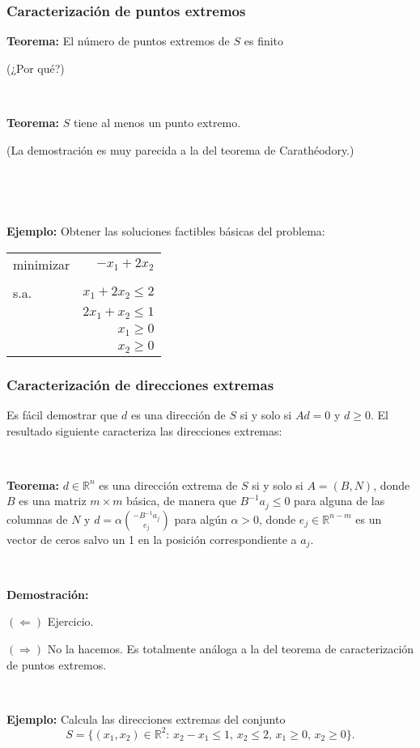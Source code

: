 \documentclass{beamer}
\begin{document}
\begin{frame}
\frametitle{Caracterización de puntos extremos}


{\bf Teorema:} El número de puntos extremos de $S$ es finito 

(¿Por qué?)

\

{\bf Teorema:} $S$ tiene al menos un punto extremo. 

(La demostración es muy parecida a la del teorema de Carathéodory.)


\



\

{\bf Ejemplo:} Obtener las soluciones factibles básicas del problema:

\begin{center}
\begin{tabular}{lr}
minimizar & $-x_1 + 2x_2$ \\
	 &  \\
s.a. & $x_1+2x_2 \leq 2$    \\
	 & $2x_1 + x_2\leq 1$  \\
	 & $x_1\geq 0$\\
	 & $x_2\geq 0$
\end{tabular}
\end{center}

\end{frame}
\begin{frame}
\frametitle{Caracterización de direcciones extremas}

Es fácil demostrar que $d$ es una dirección de $S$  si y solo si $Ad=0$ y $d\geq 0$. El resultado siguiente caracteriza las direcciones extremas:

\

{\bf Teorema:} $d\in \mathbb{R}^n$ es una dirección extrema de $S$ si y solo si $A=(B,N)$, donde $B$ es una matriz $m\times m$ básica, de manera que $B^{-1}a_j\leq 0$ para alguna de las columnas de $N$ y $d=\alpha {-B^{-1}a_j\choose e_j}$ para algún $\alpha>0$, donde $e_j\in\mathbb{R}^{n-m}$ es un vector de ceros salvo un 1 en la posición correspondiente a $a_j$. 

\

{\scriptsize
{\bf Demostración:} 



$(\Leftarrow)$ Ejercicio. 

$(\Rightarrow)$ No la hacemos. Es totalmente análoga a la del teorema de caracterización de puntos extremos.
}

\

{\bf Ejemplo:} Calcula las direcciones extremas del conjunto 
\[
S = \{(x_1,x_2)\in\mathbb{R}^2:\, x_2-x_1\leq 1,\, x_2\leq 2,\, x_1\geq 0,\, x_2\geq 0\}.
\]

\end{frame}
\end{document}
